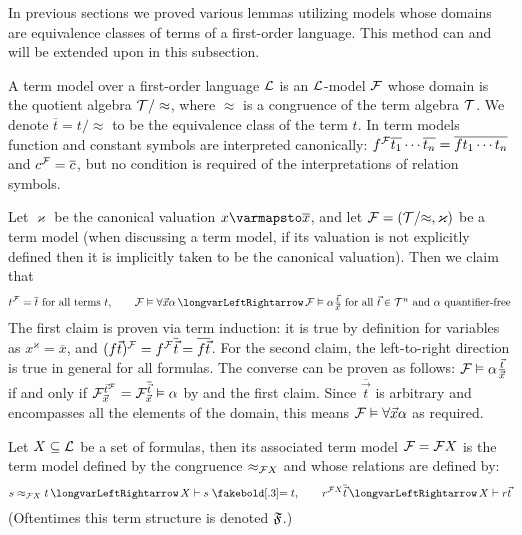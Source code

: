 In previous sections we proved various lemmas utilizing models whose domains are equivalence classes of terms of a first-order language.
This method can and will be extended upon in this subsection.

\bdefn

    A {\emphcolor term model} over a first-order language ${\cal L}$ is an ${\cal L}$-model ${\cal F}$ whose domain is the quotient algebra ${\cal T}/\approx$, where $\approx$ is a
    congruence of the term algebra ${\cal T}$.
    We denote $\overline t=t/{\approx}$ to be the equivalence class of the term $t$.
    In term models function and constant symbols are interpreted canonically: $f^{\cal F}\overline{t_1}\cdots\overline{t_n}=\overline{ft_1\cdots t_n}$ and $c^{\cal F}=\overline c$, but no condition is
    required of the interpretations of relation symbols.

\edefn

Let $\varkappa$ be the canonical valuation $x\varmapsto\overline x$, and let ${\cal F}=({\cal T}/{\approx},\varkappa)$ be a term model (when discussing a term model, if its valuation is not explicitly
defined then it is implicitly taken to be the canonical valuation).
Then we claim that
$$ t^{\cal F}=\overline t\hbox{ for all terms $t$},\qquad {\cal F}\vDash\forall\vec x\alpha\iff{\cal F}\vDash\alpha\tfrac{\vec t}{\vec x}\hbox{ for all $\vec t\in{\cal T}^n$ and $\alpha$ quantifier-free} $$
The first claim is proven via term induction: it is true by definition for variables as $x^\varkappa=\overline x$, and $(f\vec t)^{\cal F}=f^{\cal F}\overline{\vec t}=\overline{f\vec t}$.
For the second claim, the left-to-right direction is true in general for all formulas.
The converse can be proven as follows: ${\cal F}\vDash\alpha\frac{\vec t}{\vec x}$ if and only if ${\cal F}^{\vec t^{\cal F}}_{\vec x}={\cal F}^{\overline{\vec t}}_{\vec x}\vDash\alpha$ by
 and the first claim.
Since $\overline{\vec t}$ is arbitrary and encompasses all the elements of the domain, this means ${\cal F}\vDash\forall\vec x\alpha$ as required.

\bdefn

    Let $X\subseteq{\cal L}$ be a set of formulas, then its associated term model ${\cal F}={\cal F}X$ is the term model defined by the congruence $\approx_{{\cal F}X}$ and whose relations are defined by:
    $$ s\approx_{{\cal F}X}t\iff X\vdash s\eq t,\qquad r^{{\cal F}X}\overline{\vec t}\iff X\vdash r\vec t $$
    (Oftentimes this {\emphcolor term structure} is denoted $\frak F$.)

